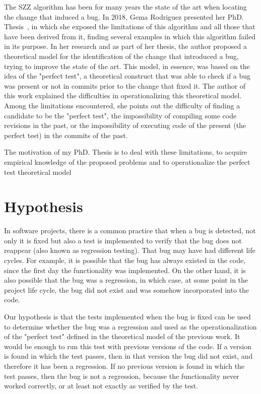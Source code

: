 The SZZ algorithm has been for many years the state of the art when locating the change that induced a bug. 
In 2018, Gema Rodriguez presented her PhD. Thesis~\cite{rodriguez2018towards}, in which she exposed the limitations of this algorithm and all those that have been derived from it, finding several examples in which this algorithm failed in its purpose. 
In her research and as part of her thesis, the author proposed a theoretical model for the identification of the change that introduced a bug, trying to improve the state of the art. 
This model, in essence, was based on the idea of the "perfect test", a theoretical construct that was able to check if a bug was present or not in commits prior to the change that fixed it. The author of this work explained the difficulties in operationalizing this theoretical model. 
Among the limitations encountered, she points out the difficulty of finding a candidate to be the "perfect test", the impossibility of compiling some code revisions in the past, or the impossibility of executing code of the present (the perfect test) in the commits of the past.

The motivation of my PhD. Thesis is to deal with these limitations, to acquire empirical knowledge of the proposed problems and to operationalize the perfect test theoretical model

\section{Hypothesis}

In software projects, there is a common practice that when a bug is detected, not only it is fixed but also a test is implemented to verify that the bug does not reappear (also known as regression testing). 
That bug may have had different life cycles. 
For example, it is possible that the bug has always existed in the code, since the first day the functionality was implemented. 
On the other hand, it is also possible that the bug was a regression, in which case, at some point in the project life cycle, the bug did not exist and was somehow incorporated into the code. 

Our hypothesis is that the tests implemented when the bug is fixed can be used to determine whether the bug was a regression and used as the operationalization of the "perfect test" defined in the theoretical model of the previous work. 
It would be enough to run this test with previous versions of the code. 
If a version is found in which the test passes, then in that version the bug did not exist, and therefore it has been a regression. 
If no previous version is found in which the test passes, then the bug is not a regression, because the functionality never worked correctly, or at least not exactly as verified by the test.

